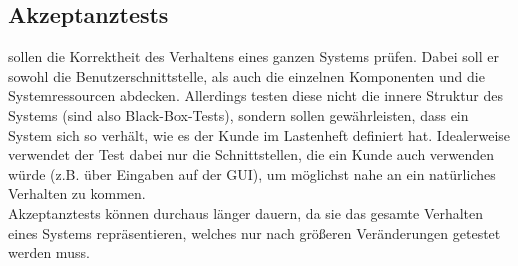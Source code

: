 \clearpage

\subsection{Akzeptanztests} 

 sollen die Korrektheit des Verhaltens eines ganzen Systems prüfen. Dabei soll er sowohl die Benutzerschnittstelle, als auch die einzelnen Komponenten und die Systemressourcen abdecken. Allerdings testen diese nicht die innere Struktur des Systems (sind also Black-Box-Tests), sondern sollen gewährleisten, dass ein System sich so verhält, wie es der Kunde im Lastenheft definiert hat. Idealerweise verwendet der Test dabei nur die Schnittstellen, die ein Kunde auch verwenden würde (z.B. über Eingaben auf der GUI), um möglichst nahe an ein natürliches Verhalten zu kommen.\\
Akzeptanztests können durchaus länger dauern, da sie das gesamte Verhalten eines Systems repräsentieren, welches nur nach größeren Veränderungen getestet werden muss.


